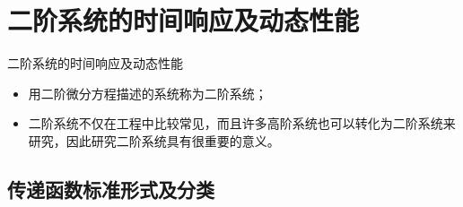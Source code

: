 \documentclass[handout,cjkutf8,table,aspectratio=1610]{beamer} %
\begin{document}
\setcounter{section}{2}
\section{二阶系统的时间响应及动态性能}
\begin{frame}{二阶系统的时间响应及动态性能}
\begin{itemize}
	\item 用二阶微分方程描述的系统称为二阶系统；
	\item 二阶系统不仅在工程中比较常见，而且许多高阶系统也可以转化为二阶系统来研究，因此研究二阶系统具有很重要的意义。
\end{itemize}
\end{frame}

\subsection{传递函数标准形式及分类}
\end{document}
